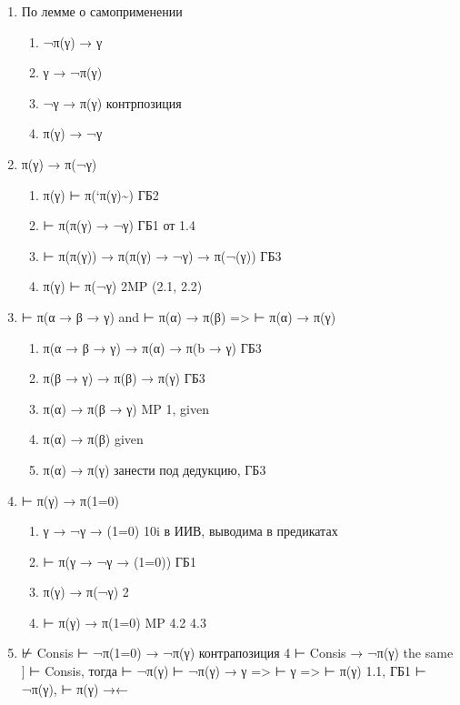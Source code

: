 \documentclass[11pt]{article}
\begin{document}
\begin{enumerate}
\item По лемме о самоприменении
\begin{enumerate}
\item ¬π(γ) → γ
\item γ → ¬π(γ)
\item ¬γ → π(γ)                            контрпозиция
\item π(γ) → ¬γ
\end{enumerate}
\item π(γ) → π(¬γ)
\begin{enumerate}
\item π(γ) ⊢ π(`π(γ)\textasciitilde{})                     ГБ2
\item ⊢ π(π(γ) → ¬γ)                       ГБ1 от 1.4
\item ⊢ π(π(γ)) → π(π(γ) → ¬γ) → π(¬(γ))   ГБ3
\item π(γ) ⊢ π(¬γ)                         2MP (2.1, 2.2)
\end{enumerate}
\item ⊢ π(α → β → γ) and ⊢ π(α) → π(β) => ⊢ π(α) → π(γ)
\begin{enumerate}
\item π(α → β → γ) → π(α) → π(b → γ)        ГБ3
\item π(β → γ) → π(β) → π(γ)                ГБ3
\item π(α) → π(β → γ)                       MP 1, given
\item π(α) → π(β)                           given
\item π(α) → π(γ)                           занести под дедукцию, ГБ3
\end{enumerate}
\item ⊢ π(γ) → π(1=0)
\begin{enumerate}
\item γ → ¬γ → (1=0)                        10i в ИИВ, выводима в предикатах
\item ⊢ π(γ → ¬γ → (1=0))                   ГБ1
\item π(γ) → π(¬γ)                          2
\item ⊢ π(γ) → π(1=0)                       MP 4.2 4.3
\end{enumerate}
\item ⊬ Consis
⊢ ¬π(1=0) → ¬π(γ)                        контрапозиция 4
⊢ Consis → ¬π(γ)                         the same
] ⊢ Consis, тогда ⊢ ¬π(γ)
⊢ ¬π(γ) → γ => ⊢ γ => ⊢ π(γ)            1.1, ГБ1
⊢ ¬π(γ), ⊢ π(γ)  →←
\end{enumerate}
\end{document}
